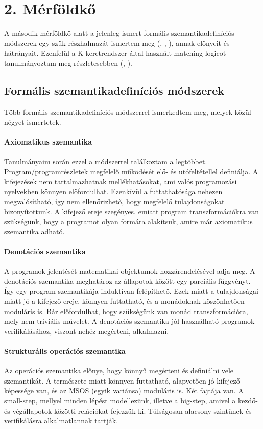 \documentclass[]{article}
\begin{document}
\section*{2. Mérföldkő}
A második mérföldkő alatt a jelenleg ismert formális szemantikadefiníciós módszerek egy szűk részhalmazát ismertem meg (\cite{formSem}, \cite{semEA}, \cite{KAndMatch}), annak előnyeit és hátrányait. Ezenfelül a K keretrendszer által használt matching logicot tanulmányoztam meg részletesebben (\cite{KAndMatch}, \cite{MatchLog}).

\subsection*{Formális szemantikadefiníciós módszerek}
Több formális szemantikadefiníciós módszerrel ismerkedtem meg, melyek közül négyet ismertetek.

\paragraph*{Axiomatikus szemantika}
Tanulmányaim során ezzel a módszerrel találkoztam a legtöbbet. Program/programrészletek megfelelő működését elő- és utófeltétellel definiálja. A kifejezések nem tartalmazhatnak mellékhatásokat, ami valós programozási nyelvekben könnyen előfordulhat. Ezenkívül a futtathatósága nehezen megvalósítható, így nem ellenőrizhető, hogy megfelelő tulajdonságokat bizonyítottunk. A kifejező ereje szegényes, emiatt program transzformációkra van szükségünk, hogy a programot olyan formára alakítsuk, amire már axiomatikus szemantika adható.

\paragraph{Denotációs szemantika}
A programok jelentését matematikai objektumok hozzárendelésével adja meg. A denotációs szemantika meghatároz az állapotok között egy parciális függvényt. Így egy program szemantikája induktívan felépíthető. Ezek miatt a tulajdonságai miatt jó a kifejező ereje, könnyen futtatható, és a monádoknak köszönhetően moduláris is. Bár előfordulhat, hogy szükségünk van monád transzformációra, mely nem triviális művelet. A denotációs szemantika jól használható programok verifikálásához, viszont nehéz megérteni, alkalmazni.

\paragraph*{Strukturális operációs szemantika}
Az operációs szemantika előnye, hogy könnyű megérteni és definiálni vele szemantikát. A természete miatt könnyen futtatható, alapvetően jó kifejező képessége van, és az MSOS (egyik variánsa) moduláris is. Két fajtája van. A small-step, mellyel minden lépést modellezünk, illetve a big-step, amivel a kezdő- és végállapotok közötti relációkat fejezzük ki. Túlságosan alacsony szintűnek és verifikálásra alkalmatlannak tartják.
\end{document}
